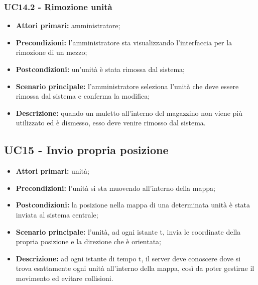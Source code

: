 \subsubsection{UC14.2 - Rimozione unità}
\begin{itemize}
	\item 	\textbf{Attori primari:} amministratore;
	\item 	\textbf{Precondizioni:} l'amministratore sta visualizzando l'interfaccia per la rimozione di un mezzo;
	\item 	\textbf{Postcondizioni:} un'unità è stata rimossa dal sistema;
	\item 	\textbf{Scenario principale:} l'amministratore seleziona l'unità che deve essere rimossa dal sistema e conferma la modifica;
	\item 	\textbf{Descrizione:} quando un muletto all'interno del magazzino non viene più utilizzato ed è dismesso, esso deve venire rimosso dal sistema.
	
\end{itemize}

\subsection{UC15 - Invio propria posizione}
\begin{itemize}
	\item 	\textbf{Attori primari:} unità;
	\item 	\textbf{Precondizioni:} l'unità si sta muovendo all'interno della mappa;
	\item 	\textbf{Postcondizioni:} la posizione nella mappa di una determinata unità è stata inviata al sistema centrale;
	\item 	\textbf{Scenario principale:} l'unità, ad ogni istante t, invia le coordinate della propria posizione e la direzione che è orientata;
	\item 	\textbf{Descrizione:} ad ogni istante di tempo t, il server deve conoscere dove si trova esattamente ogni unità all'interno della mappa, così da poter gestirne il movimento ed evitare collisioni.
	
\end{itemize}


